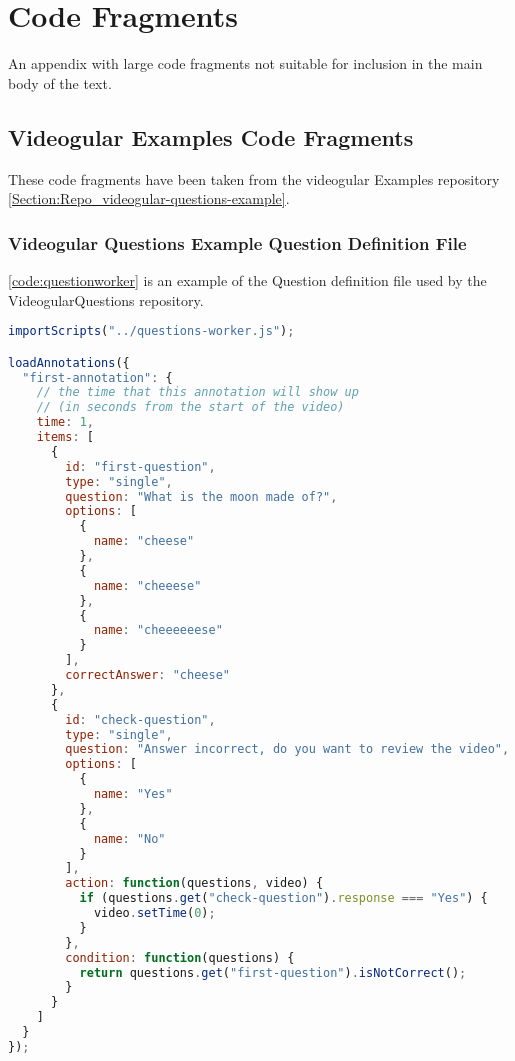 \chapter{Code Fragments} \label{App:Code Fragments}

\begin{preamble}
	An appendix with large code fragments not suitable for inclusion in the main body of the text.
\end{preamble}

\section{Videogular Examples Code Fragments}

These code fragments have been taken from the videogular Examples repository \autoref{Section:Repo_videogular-questions-example}.

\subsection{Videogular Questions Example Question Definition File}

\autoref{code:questionworker} is an example of the Question definition file used by the VideogularQuestions repository.

\begin{lstlisting}[language=javascript,caption={Code for loading an annotation},label={code:questionworker} ]
importScripts("../questions-worker.js");

loadAnnotations({
  "first-annotation": {
    // the time that this annotation will show up
    // (in seconds from the start of the video)
    time: 1,
    items: [
      {
        id: "first-question",
        type: "single",
        question: "What is the moon made of?",
        options: [
          {
            name: "cheese"
          },
          {
            name: "cheeese"
          },
          {
            name: "cheeeeeese"
          }
        ],
        correctAnswer: "cheese"
      },
      {
        id: "check-question",
        type: "single",
        question: "Answer incorrect, do you want to review the video",
        options: [
          {
            name: "Yes"
          },
          {
            name: "No"
          }
        ],
        action: function(questions, video) {
          if (questions.get("check-question").response === "Yes") {
            video.setTime(0);
          }
        },
        condition: function(questions) {
          return questions.get("first-question").isNotCorrect();
        }
      }
    ]
  }
});
\end{lstlisting}

